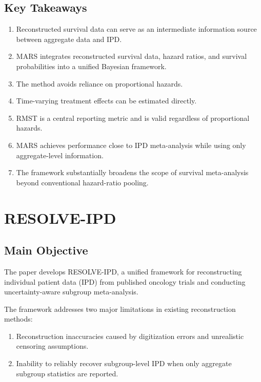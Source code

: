 \documentclass[11pt]{article}
\begin{document}
\subsection*{Key Takeaways}

\begin{enumerate}
    \item Reconstructed survival data can serve as an intermediate information source between aggregate data and IPD.
    \item MARS integrates reconstructed survival data, hazard ratios, and survival probabilities into a unified Bayesian framework.
    \item The method avoids reliance on proportional hazards.
    \item Time-varying treatment effects can be estimated directly.
    \item RMST is a central reporting metric and is valid regardless of proportional hazards.
    \item MARS achieves performance close to IPD meta-analysis while using only aggregate-level information.
    \item The framework substantially broadens the scope of survival meta-analysis beyond conventional hazard-ratio pooling.
\end{enumerate}

\section{RESOLVE-IPD}

\subsection*{Main Objective}

The paper develops RESOLVE-IPD, a unified framework for reconstructing individual patient data (IPD) from published oncology trials and conducting uncertainty-aware subgroup meta-analysis.

The framework addresses two major limitations in existing reconstruction methods:

\begin{enumerate}
    \item Reconstruction inaccuracies caused by digitization errors and unrealistic censoring assumptions.
    \item Inability to reliably recover subgroup-level IPD when only aggregate subgroup statistics are reported.
\end{enumerate}
\end{document}
